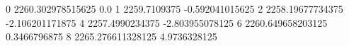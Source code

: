 0 2260.302978515625 0.0
1 2259.7109375 -0.592041015625
2 2258.19677734375 -2.106201171875
4 2257.4990234375 -2.803955078125
6 2260.649658203125 0.3466796875
8 2265.276611328125 4.9736328125
